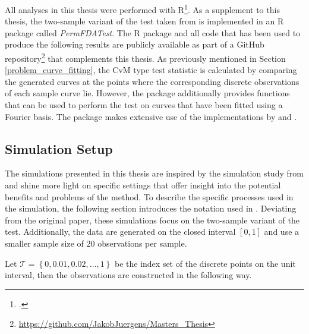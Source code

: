 \documentclass[12pt, a4paper]{article}
\theoremstyle{MAstyle} \newtheorem{assumption}{Assumption}[section]
\theoremstyle{MAstyle} \newtheorem{definition}{Definition}[section]
\theoremstyle{MAstyle} \newtheorem{theorem}{Theorem}[section]
\begin{document}
		All analyses in this thesis were performed with R\footcite{R}. As a supplement to this thesis, the two-sample variant of the test taken from \cite{bugni_permutation_2021} is implemented in an R package called \textit{PermFDATest}. The R package and all code that has been used to produce the following results are publicly available as part of a GitHub repository\footnote{\href{https://github.com/JakobJuergens/Masters_Thesis}{https://github.com/JakobJuergens/Masters\_Thesis}} that complements this thesis. As previously mentioned in Section \ref{problem_curve_fitting}, the CvM type test statistic is calculated by comparing the generated curves at the points where the corresponding discrete observations of each sample curve lie. However, the package additionally provides functions that can be used to perform the test on curves that have been fitted using a Fourier basis.
		The package makes extensive use of the implementations by \cite{fda} and \cite{tidyverse}.

		\subsection{Simulation Setup}
		The simulations presented in this thesis are inspired by the simulation study from \cite{bugni_permutation_2021} and shine more light on specific settings that offer insight into the potential benefits and problems of the method. 
		To describe the specific processes used in the simulation, the following section introduces the notation used in \cite{bugni_permutation_2021}. 
		Deviating from the original paper, these simulations focus on the two-sample variant of the test. Additionally, the data are generated on the closed interval $\left[0,1\right]$ and use a smaller sample size of $20$ observations per sample. 
		
		\newpage
		Let $\mathcal{T} = \left\{0, 0.01, 0.02, \dots, 1\right\}$ be the index set of the discrete points on the unit interval, then the observations are constructed in the following way.\\
		
\end{document}
